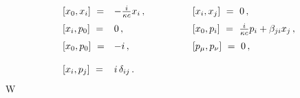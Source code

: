 \begin{equation}
\begin{array}{lll} [ x_0 , x_i ] \ = & -\frac{i}{\kappa c} x_i\, ,
\qquad\qquad & [ x_i , x_j ] \ = \ 0\, ,\medskip\cr [ x_i , p_0 ]
\ = &  0\, , & [ x_0 , p_i ] \ = \  \frac{i}{\kappa c} p_i +
\beta_{j i} x_j\, ,\medskip\cr [ x_0 , p_0 ] \ = & - i\, , & [
p_\mu , p_\nu ] \ = \ 0\, ,\bigskip\cr [ x_i , p_j ] \ = &
i\,\delta_{i j}  \, .&\end{array}\label{r323}\end{equation}W
